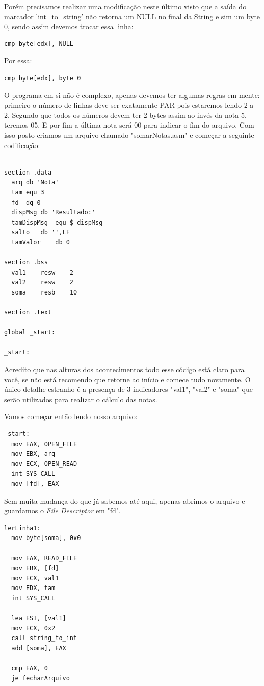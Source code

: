 Porém precisamos realizar uma modificação neste último visto que a saída do marcador 'int\_to\_string' não retorna um NULL no final da String e sim um byte 0, sendo assim devemos trocar essa linha:
\begin{lstlisting}[]
  cmp byte[edx], NULL
\end{lstlisting}

Por essa:
\begin{lstlisting}[]
  cmp byte[edx], byte 0
\end{lstlisting}

O programa em si não é complexo, apenas devemos ter algumas regras em mente: primeiro o número de linhas deve ser exatamente PAR pois estaremos lendo 2 a 2. Segundo que todos os números devem ter 2 bytes assim ao invés da nota 5, teremos 05. E por fim a última nota será 00 para indicar o fim do arquivo. Com isso posto criamos um arquivo chamado "somarNotas.asm" e começar a seguinte codificação:
\begin{lstlisting}[]
%include 'bibliotecaE.inc'

section .data
  arq db 'Nota'
  tam equ 3
  fd  dq 0
  dispMsg db 'Resultado:'
  tamDispMsg  equ $-dispMsg
  salto   db '',LF
  tamValor    db 0

section .bss
  val1    resw    2
  val2    resw    2
  soma    resb    10

section .text

global _start:

_start:
\end{lstlisting}

Acredito que nas alturas dos acontecimentos todo esse código está claro para você, se não está recomendo que retorne ao início e comece tudo novamente. O único detalhe estranho é a presença de 3 indicadores "val1", "val2" e "soma" que serão utilizados para realizar o cálculo das notas.

Vamos começar então lendo nosso arquivo:
\begin{lstlisting}[]
_start:
  mov EAX, OPEN_FILE
  mov EBX, arq
  mov ECX, OPEN_READ
  int SYS_CALL
  mov [fd], EAX
\end{lstlisting}

Sem muita mudança do que já sabemos até aqui, apenas abrimos o arquivo e guardamos o \textit{File Descriptor} em "fd".
\begin{lstlisting}[]
lerLinha1:
  mov byte[soma], 0x0 

  mov EAX, READ_FILE
  mov EBX, [fd]
  mov ECX, val1
  mov EDX, tam   
  int SYS_CALL

  lea ESI, [val1]
  mov ECX, 0x2
  call string_to_int
  add [soma], EAX

  cmp EAX, 0
  je fecharArquivo
\end{lstlisting}

